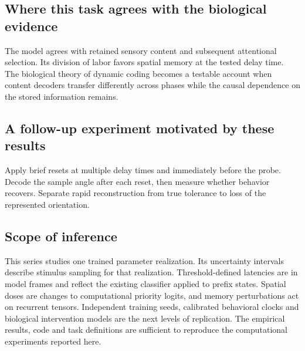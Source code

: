 \documentclass[11pt]{article}
\begin{document}
\subsection{Where this task agrees with the biological evidence}
The model agrees with retained sensory content and subsequent attentional selection. Its division of labor favors spatial memory at the tested delay time. The biological theory of dynamic coding becomes a testable account when content decoders transfer differently across phases while the causal dependence on the stored information remains.

\subsection{A follow-up experiment motivated by these results}
Apply brief resets at multiple delay times and immediately before the probe. Decode the sample angle after each reset, then measure whether behavior recovers. Separate rapid reconstruction from true tolerance to loss of the represented orientation.
\subsection{Scope of inference}
This series studies one trained parameter realization. Its uncertainty intervals describe stimulus sampling for that realization. Threshold-defined latencies are in model frames and reflect the existing classifier applied to prefix states. Spatial doses are changes to computational priority logits, and memory perturbations act on recurrent tensors. Independent training seeds, calibrated behavioral clocks and biological intervention models are the next levels of replication. The empirical results, code and task definitions are sufficient to reproduce the computational experiments reported here.
\end{document}
